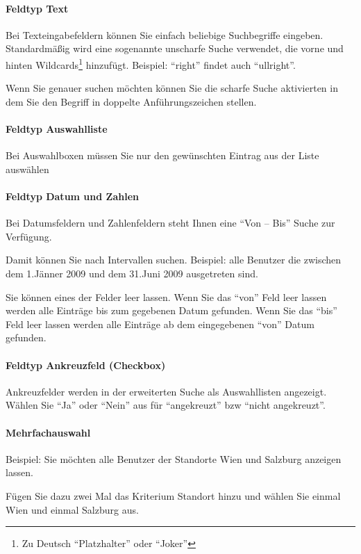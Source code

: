 \documentclass[article, a4paper, oneside, 11pt]{memoir}
\begin{document}
\paragraph{Feldtyp Text}
Bei Texteingabefeldern können Sie einfach beliebige Suchbegriffe eingeben. Standardmäßig wird eine sogenannte unscharfe Suche verwendet, die vorne und hinten Wildcards\footnote{Zu Deutsch "`Platzhalter"' oder "`Joker"'} hinzufügt. Beispiel: "`right"' findet auch "`ullright"'.

Wenn Sie genauer suchen möchten können Sie die scharfe Suche aktivierten in dem Sie den Begriff in doppelte Anführungszeichen stellen.

\paragraph[Feldtyp Auswahlliste]{Feldtyp Auswahlliste}
Bei Auswahlboxen müssen Sie nur den gewünschten Eintrag aus der Liste auswählen

\paragraph{Feldtyp Datum und Zahlen}
Bei Datumsfeldern und Zahlenfeldern steht Ihnen eine "`Von -- Bis"' Suche zur Verfügung.

Damit können Sie nach Intervallen suchen. Beispiel: alle Benutzer die zwischen dem 1.Jänner 2009 und dem 31.Juni 2009 ausgetreten sind.

Sie können eines der Felder leer lassen. Wenn Sie das "`von"' Feld leer lassen werden alle Einträge bis zum gegebenen Datum gefunden. Wenn Sie das "`bis"' Feld leer lassen werden alle Einträge ab dem eingegebenen "`von"' Datum gefunden.

\paragraph{Feldtyp Ankreuzfeld (Checkbox)}
Ankreuzfelder werden in der erweiterten Suche als Auswahllisten angezeigt. Wählen Sie "`Ja"' oder "`Nein"' aus für "`angekreuzt"' bzw "`nicht angekreuzt"'.

\paragraph{Mehrfachauswahl}
Beispiel: Sie möchten alle Benutzer der Standorte Wien und Salzburg anzeigen lassen.

Fügen Sie dazu zwei Mal das Kriterium Standort hinzu und wählen Sie einmal Wien und einmal Salzburg aus.
\end{document}
